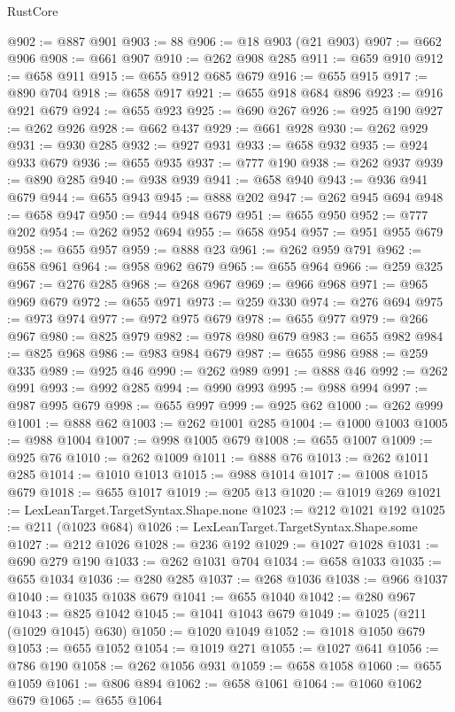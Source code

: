 \begin{lexlean}{RustCore}
\begin{coremodule}
@902 := @887 @901
@903 := 88
@906 := @18 @903 (@21 @903)
@907 := @662 @906
@908 := @661 @907
@910 := @262 @908 @285
@911 := @659 @910
@912 := @658 @911
@915 := @655 @912 @685 @679
@916 := @655 @915
@917 := @890 @704
@918 := @658 @917
@921 := @655 @918 @684 @896
@923 := @916 @921 @679
@924 := @655 @923
@925 := @690 @267
@926 := @925 @190
@927 := @262 @926
@928 := @662 @437
@929 := @661 @928
@930 := @262 @929
@931 := @930 @285
@932 := @927 @931
@933 := @658 @932
@935 := @924 @933 @679
@936 := @655 @935
@937 := @777 @190
@938 := @262 @937
@939 := @890 @285
@940 := @938 @939
@941 := @658 @940
@943 := @936 @941 @679
@944 := @655 @943
@945 := @888 @202
@947 := @262 @945 @694
@948 := @658 @947
@950 := @944 @948 @679
@951 := @655 @950
@952 := @777 @202
@954 := @262 @952 @694
@955 := @658 @954
@957 := @951 @955 @679
@958 := @655 @957
@959 := @888 @23
@961 := @262 @959 @791
@962 := @658 @961
@964 := @958 @962 @679
@965 := @655 @964
@966 := @259 @325
@967 := @276 @285
@968 := @268 @967
@969 := @966 @968
@971 := @965 @969 @679
@972 := @655 @971
@973 := @259 @330
@974 := @276 @694
@975 := @973 @974
@977 := @972 @975 @679
@978 := @655 @977
@979 := @266 @967
@980 := @825 @979
@982 := @978 @980 @679
@983 := @655 @982
@984 := @825 @968
@986 := @983 @984 @679
@987 := @655 @986
@988 := @259 @335
@989 := @925 @46
@990 := @262 @989
@991 := @888 @46
@992 := @262 @991
@993 := @992 @285
@994 := @990 @993
@995 := @988 @994
@997 := @987 @995 @679
@998 := @655 @997
@999 := @925 @62
@1000 := @262 @999
@1001 := @888 @62
@1003 := @262 @1001 @285
@1004 := @1000 @1003
@1005 := @988 @1004
@1007 := @998 @1005 @679
@1008 := @655 @1007
@1009 := @925 @76
@1010 := @262 @1009
@1011 := @888 @76
@1013 := @262 @1011 @285
@1014 := @1010 @1013
@1015 := @988 @1014
@1017 := @1008 @1015 @679
@1018 := @655 @1017
@1019 := @205 @13
@1020 := @1019 @269
@1021 := LexLeanTarget.TargetSyntax.Shape.none
@1023 := @212 @1021 @192
@1025 := @211 (@1023 @684)
@1026 := LexLeanTarget.TargetSyntax.Shape.some
@1027 := @212 @1026
@1028 := @236 @192
@1029 := @1027 @1028
@1031 := @690 @279 @190
@1033 := @262 @1031 @704
@1034 := @658 @1033
@1035 := @655 @1034
@1036 := @280 @285
@1037 := @268 @1036
@1038 := @966 @1037
@1040 := @1035 @1038 @679
@1041 := @655 @1040
@1042 := @280 @967
@1043 := @825 @1042
@1045 := @1041 @1043 @679
@1049 := @1025 (@211 (@1029 @1045) @630)
@1050 := @1020 @1049
@1052 := @1018 @1050 @679
@1053 := @655 @1052
@1054 := @1019 @271
@1055 := @1027 @641
@1056 := @786 @190
@1058 := @262 @1056 @931
@1059 := @658 @1058
@1060 := @655 @1059
@1061 := @806 @894
@1062 := @658 @1061
@1064 := @1060 @1062 @679
@1065 := @655 @1064

\end{coremodule}
\end{lexlean}
